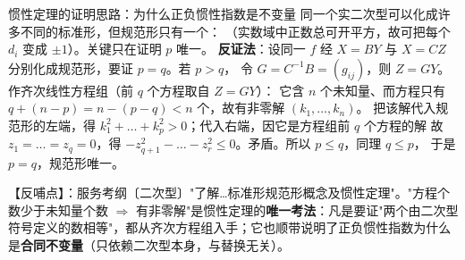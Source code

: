 
\begin{fdeep}{惯性定理的证明思路：为什么正负惯性指数是不变量}
同一个实二次型可以化成许多不同的标准形，但规范形只有一个：
（实数域中正数总可开平方，故可把每个 $d_i$ 变成 $\pm1$）。关键只在证明 $p$ 唯一。
\textbf{反证法}：设同一 $f$ 经 $X=BY$ 与 $X=CZ$ 分别化成规范形，要证 $p=q$。若 $p>q$，
令 $G=C^{-1}B=(g_{ij})$，则 $Z=GY$。作齐次线性方程组（前 $q$ 个方程取自 $Z=GY$）：
它含 $n$ 个未知量、而方程只有 $q+(n-p)=n-(p-q)<n$ 个，故有非零解 $(k_1,\dots,k_n)$。
把该解代入规范形的左端，得 $k_1^{2}+\dots+k_p^{2}>0$；代入右端，因它是方程组前 $q$ 个方程的解
故 $z_1=\dots=z_q=0$，得 $-z_{q+1}^{2}-\dots-z_r^{2}\le0$。矛盾。所以 $p\le q$，同理 $q\le p$，
于是 $p=q$，规范形唯一。

【反哺点】：服务考纲〔二次型〕"了解…标准形规范形概念及惯性定理"。"方程个数少于未知量个数 $\Longrightarrow$ 有非零解"是惯性定理的\textbf{唯一考法}：凡是要证"两个由二次型符号定义的数相等"，都从齐次方程组入手；它也顺带说明了正负惯性指数为什么是\textbf{合同不变量}（只依赖二次型本身，与替换无关）。
\end{fdeep}

